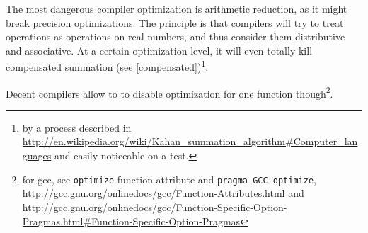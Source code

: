 
The most dangerous compiler optimization is arithmetic reduction, as it might break precision optimizations. The principle is that compilers will try to treat operations as operations on real numbers, and thus consider them distributive and associative. At a certain optimization level, it will even totally kill compensated summation (see \ref{compensated})\footnote{by a process described in \url{http://en.wikipedia.org/wiki/Kahan_summation_algorithm\#Computer_languages} and easily noticeable on a test.}.

Decent compilers allow to to disable optimization for one function though\footnote{for gcc, see \texttt{optimize} function attribute and \texttt{pragma GCC optimize}, \url{http://gcc.gnu.org/onlinedocs/gcc/Function-Attributes.html} and \url{http://gcc.gnu.org/onlinedocs/gcc/Function-Specific-Option-Pragmas.html\#Function-Specific-Option-Pragmas}}.









